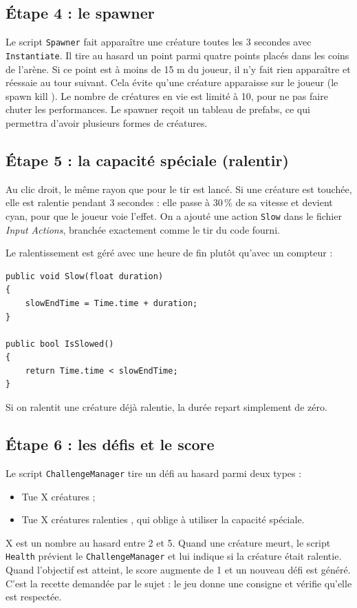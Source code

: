 \documentclass[11pt,a4paper]{article}
\begin{document}
\subsection{Étape 4 : le spawner}
Le script \texttt{Spawner} fait apparaître une créature toutes les 3 secondes avec \texttt{Instantiate}. Il tire au hasard un point parmi quatre points placés dans les coins de l'arène. Si ce point est à moins de 15 m du joueur, il n'y fait rien apparaître et réessaie au tour suivant. Cela évite qu'une créature apparaisse sur le joueur (le \og spawn kill \fg{}). Le nombre de créatures en vie est limité à 10, pour ne pas faire chuter les performances. Le spawner reçoit un tableau de prefabs, ce qui permettra d'avoir plusieurs formes de créatures.

\subsection{Étape 5 : la capacité spéciale (ralentir)}
Au clic droit, le même rayon que pour le tir est lancé. Si une créature est touchée, elle est ralentie pendant 3 secondes : elle passe à 30\,\% de sa vitesse et devient cyan, pour que le joueur voie l'effet. On a ajouté une action \texttt{Slow} dans le fichier \emph{Input Actions}, branchée exactement comme le tir du code fourni.

Le ralentissement est géré avec une heure de fin plutôt qu'avec un compteur :

\begin{lstlisting}
public void Slow(float duration)
{
    slowEndTime = Time.time + duration;
}

public bool IsSlowed()
{
    return Time.time < slowEndTime;
}
\end{lstlisting}

Si on ralentit une créature déjà ralentie, la durée repart simplement de zéro.

\subsection{Étape 6 : les défis et le score}
Le script \texttt{ChallengeManager} tire un défi au hasard parmi deux types :
\begin{itemize}
  \item \og Tue X créatures \fg{} ;
  \item \og Tue X créatures ralenties \fg{}, qui oblige à utiliser la capacité spéciale.
\end{itemize}
X est un nombre au hasard entre 2 et 5. Quand une créature meurt, le script \texttt{Health} prévient le \texttt{ChallengeManager} et lui indique si la créature était ralentie. Quand l'objectif est atteint, le score augmente de 1 et un nouveau défi est généré. C'est la \og recette \fg{} demandée par le sujet : le jeu donne une consigne et vérifie qu'elle est respectée.
\end{document}
